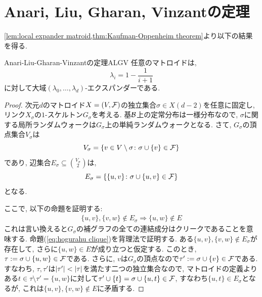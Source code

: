 \section{Anari, Liu, Gharan, Vinzantの定理}
\cref{lem:local expander matroid,thm:Kaufman-Oppenheim theorem}より以下の結果を得る.
\begin{theorem}{Anari-Liu-Gharan-Vinzantの定理}{ALGV}
    任意のマトロイドは,
    \[ \lambda_i = 1-\frac{1}{i+1}\]
    に対して大域$(\lambda_0,\dots,\lambda_d)$-エクスパンダーである.
\end{theorem}
\begin{proof}
    次元$d$のマトロイド$X=(V,\F)$の独立集合$\sigma \in X(d-2)$を任意に固定し, リンク$X_\sigma$の$1$-スケルトン$G_\sigma$を考える.
    基$\B$上の定常分布は一様分布なので,
    $\sigma$に関する局所ランダムウォークは$G_\sigma$上の単純ランダムウォークとなる.
    さて, $G_\sigma$の頂点集合$V_\sigma$は
    \[V_\sigma = \{v\in V\setminus\sigma\colon \sigma\cup \{v\} \in \F\}\]
    であり,
    辺集合$E_\sigma \subseteq \binom{V_\sigma}{2}$は,
    \[
        E_\sigma = \cbra*{ \{u,v\}\colon \sigma\cup\{u,v\}\in \F }
    \]
    となる.

    ここで, 以下の命題を証明する:
    \begin{align}
        \{u,v\},\{v,w\}\not\in E_\sigma \Rightarrow \{u,w\} \not\in E \label{eq:hogurahu clique}        
    \end{align}
    これは言い換えると$G_\sigma$の補グラフの全ての連結成分はクリークであることを意味する.
    命題(\ref{eq:hogurahu clique})を背理法で証明する.
    ある$\{u,v\},\{v,w\}\not\in E_\sigma$が存在して, さらに$\{u,w\}\in E$が成り立つと仮定する.
    このとき, $\tau\defeq \sigma\cup\{u,w\}\in \F$である.
    さらに, $v$は$G_\sigma$の頂点なので$\tau'\defeq \sigma\cup\{v\} \in \F$である.
    すなわち, $\tau,\tau'$は$\abs{\tau'} < \abs{\tau}$を満たす二つの独立集合なので, マトロイドの定義より
    ある$t \in \tau \setminus \tau' = \{u,w\}$に対して$\tau'\cup \{t\}=\sigma\cup\{u,t\} \in \F$, すなわち$\{u,t\}\in E_\sigma$となるが, これは$\{u,v\},\{v,w\}\not\in E$に矛盾する.


\end{proof}
